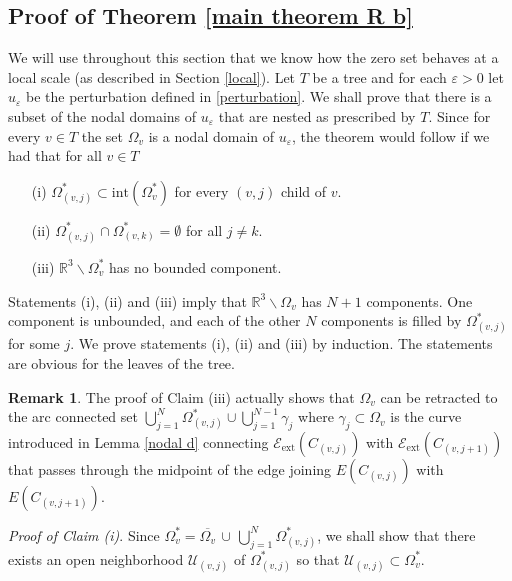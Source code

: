 \documentclass[11pt,reqno]{amsart}
\newcommand{\R}{{\mathbb R}}
\newcommand{\ep}{\varepsilon}
\theoremstyle{definition}
\newtheorem{remark}{Remark}
\begin{document}
 \subsection{Proof of Theorem \ref{main theorem R b}}
We will use throughout this section that we know how the zero set behaves at a local scale (as described in Section \ref{local}).
 Let $T$ be a tree and for each  $\ep>0$ let $u_\ep$ be the perturbation defined in \eqref{perturbation}.  We shall prove that there is a subset of the nodal domains of $u_\ep$ that are nested as prescribed by $T$. Since for every $v \in T$ the set $\Omega_v$ is a nodal domain of $u_\ep$, the theorem would follow if we had that for all $v \in T$ \medskip
\begin{itemize} 
\item[(i)] $\Omega_{(v,j)}^* \subset \text{int} (\Omega_v^*)$  for every $(v,j)$ child of $v$.\\
\item[(ii)] $\Omega_{(v,j)}^* \cap \Omega_{(v,k)}^* =\emptyset$ for all $ j\neq k$.\\
\item[(iii)]  $\R^3 \backslash \Omega_v^*$ has no bounded component.\\
\end{itemize}

Statements (i), (ii) and (iii) imply that $\R^3 \backslash \Omega_v$ has $N+1$ components. One component is unbounded, and each of the other $N$ components is filled by  $\Omega_{(v,j)}^*$ for some $j$.
We prove statements (i), (ii) and (iii)  by induction. The statements are obvious for the leaves of the tree.\\

\begin{remark}
The proof of Claim (iii) actually shows that $\Omega_v$ can be retracted to the arc connected set $\bigcup_{j=1}^N \Omega_{(v,j)}^* \cup \bigcup_{j=1}^{N-1}\gamma_j$ where $\gamma_j \subset \Omega_v$ is the curve  introduced in Lemma \ref{nodal d} connecting  $ \mathcal E_{\text{ext}} (C_{(v,j)})$ with $\mathcal E_{\text{ext}} (C_{(v,j+1)})$  that passes through the midpoint of the edge joining  $E(C_{(v,j)})$ with $E(C_{(v,j+1)})$.
\end{remark}

 \emph{Proof of Claim (i)}. Since $\Omega_v^*= \overline{\Omega_v}\, \cup\, \bigcup_{j=1}^N \Omega_{(v,j)}^*$, we shall show that there exists an open neighborhood $\mathcal U_{(v,j)}$ of  $\Omega_{(v,j)}^*$ so that 
 $\mathcal U_{(v,j)} \subset \Omega_v^*.$
 
\end{document}
